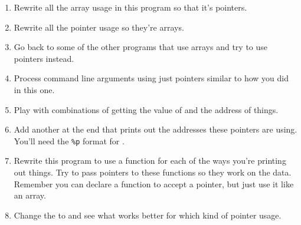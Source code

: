 \begin{enumerate}
\item Rewrite all the array usage in this program so that it's pointers.
\item Rewrite all the pointer usage so they're arrays.
\item Go back to some of the other programs that use arrays and 
    try to use pointers instead.
\item Process command line arguments using just pointers similar to how
    you did  in this one.
\item Play with combinations of getting the value of and the address of
    things.
\item Add another  at the end that prints out the
    addresses these pointers are using.  You'll need the \verb|%p| format
    for .
\item Rewrite this program to use a function for each of the ways you're
    printing out things.  Try to pass pointers to these functions so 
    they work on the data.  Remember you can declare a function to accept
    a pointer, but just use it like an array.
\item Change the  to  and see what
    works better for which kind of pointer usage.
\end{enumerate}


